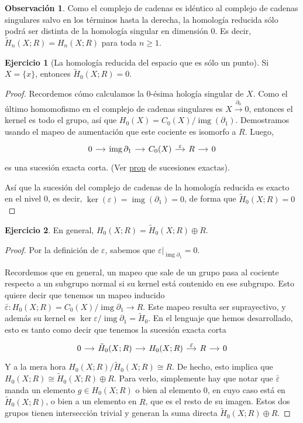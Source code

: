 \documentclass[spanish]{book}
\theoremstyle{definition}
\newtheorem*{obs}{Observación}
\newtheorem*{ejer}{Ejercicio}
\DeclareMathOperator{\img}{img}
\begin{document}
	\begin{obs}
		Como el complejo de cadenas es idéntico al complejo de cadenas singulares salvo en los términos hasta la derecha, la homología reducida sólo podrá ser distinta de la homología singular en dimensión 0. Es decir,
		 $\tilde H_n(X;R)=H_n(X;R)$ para toda $n\geq 1$.
	\end{obs}
	
	\begin{ejer}[La homología reducida del espacio que es sólo un punto]
		Si $X=\{x\}$, entonces $\tilde H_0(X;R)=0$. 
	\end{ejer}
	\begin{proof}
		Recordemos cómo calculamos la 0-ésima hología singular de $X$. Como el último homomofismo en el complejo de cadenas singulares es $X\xrightarrow{\partial_0}0$, entonces el kernel es todo el grupo, así que $H_0(X)=C_0(X)/\img(\partial_1)$. Demostramos usando el mapeo de aumentación que este cociente es isomorfo a $R$. Luego,
		\[\begin{tikzcd}[column sep=small] 
			0\arrow[r]&\img\partial_1\arrow[r]&C_0(X)\arrow[r,"\varepsilon"]&R\arrow[r]&0
		\end{tikzcd}\]
		es una sucesión exacta corta. (Ver \hyperref[sucex]{prop} de sucesiones exactas).
				
		 Así que la sucesión del complejo de cadenas de la homología reducida es exacto en el nivel 0, es decir, $\ker(\varepsilon)=\img(\partial_1)=0$, de forma que $\tilde{H}_0(X;R)=0$
	\end{proof}
	\begin{ejer}
		En general, $H_0(X;R)=\tilde H_0(X;R)\oplus R$.
	\end{ejer}
	\begin{proof}
	 Por la definición de $\varepsilon$, sabemos que $\varepsilon|_{\img\partial_1}=0$. 
		
		Recordemos que en general, un mapeo que sale de un grupo pasa al cociente respecto a un subgrupo normal si su kernel está contenido en ese subgrupo. Esto quiere decir que tenemos un mapeo inducido $\bar{\varepsilon}:H_0(X;R)=C_0(X)/\img\partial_1\to R$. Este mapeo resulta ser suprayectivo, y además su kernel es $\ker\varepsilon/\img\partial_1=\tilde{H}_0$. En el lenguaje que hemos desarrollado, esto es tanto como decir que tenemos la sucesión exacta corta
		\[\begin{tikzcd}[column sep=small]
			0\arrow[r]&\tilde{H}_0(X;R)\arrow[r]&H_0(X;R)\arrow[r,"\bar\varepsilon"]&R\arrow[r]&0
		\end{tikzcd}\]
		Y a la mera hora $H_0(X;R)/\tilde{H}_0(X;R)\cong R$. De hecho, esto implica que $H_0(X;R)\cong\tilde{H}_0(X;R)\oplus R$. Para verlo, simplemente hay que notar que $\bar{\varepsilon}$ manda un elemento $g\in H_0(X;R)$ o bien al elemento 0, en cuyo caso está en $\tilde{H}_0(X;R)$, o bien a un elemento en $R$, que es el resto de su imagen. Estos dos grupos tienen intersección trivial y generan la suma directa $\tilde{H}_0(X;R)\oplus R$.
	\end{proof}
\end{document}
